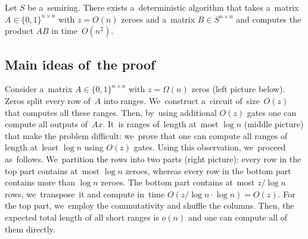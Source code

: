 \documentclass{toc}
\begin{document}
\begin{corollary}
    \label{cor:matrixmultiplication}
    Let $S$ be a~semiring. There exists a~deterministic algorithm that takes a~matrix
    ${A \in \{0,1\}^{n \times n}}$ with $z=O(n)$ zeroes and a~matrix
    $B \in S^{n \times n}$ and computes the product $AB$ in time~$O(n^2)$.
\end{corollary}

\subsection{Main ideas of~the proof}

Consider a~matrix $A \in \{0,1\}^{n \times n}$
with $z=\Omega(n)$ zeros (left picture below).
Zeros split every row of~$A$ into ranges.
We~construct a~circuit of~size~$O(z)$ that computes all these ranges. Then, by~using additional $O(z)$ gates one can
compute all outputs of~$Ax$. It~is ranges of~length at~most $\log n$ (middle picture) that make the problem difficult:
we~prove that one can compute
all ranges of length at~least $\log n$ using $O(z)$ gates.
Using this observation, we~proceed as~follows.
We~partition the rows into two parts (right picture): every row in the top part contains at~most $\log n$ zeroes, whereas every row in the bottom part contains more than $\log n$ zeroes. The bottom part contains at~most $z/\log n$
rows,
we~transpose~it and compute in~time $O(z/\log n \cdot \log n)=O(z)$. For the top part, we~employ the commutativity and shuffle the columns. Then, the expected total length of all short ranges is $o(n)$ and one can
compute all of them directly.
\end{document}
